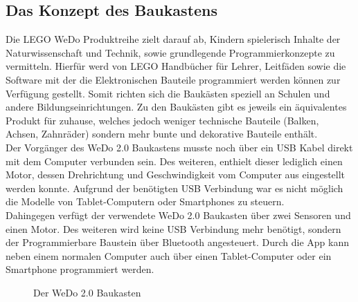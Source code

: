 \subsection{Das Konzept des Baukastens}
Die LEGO WeDo Produktreihe zielt darauf ab, Kindern spielerisch Inhalte der Naturwissenschaft und Technik, sowie grundlegende Programmierkonzepte zu vermitteln. Hierfür werd von LEGO Handbücher für Lehrer, Leitfäden sowie die Software mit der die Elektronischen Bauteile programmiert werden können zur Verfügung gestellt. Somit richten sich die Baukästen speziell an Schulen und andere Bildungseinrichtungen. Zu den Baukästen gibt es jeweils ein äquivalentes Produkt für zuhause, welches jedoch weniger technische Bauteile (Balken, Achsen, Zahnräder) sondern mehr bunte und dekorative Bauteile enthält.\\ 
Der Vorgänger des WeDo 2.0 Baukastens musste noch über ein USB Kabel direkt mit dem Computer verbunden sein. Des weiteren, enthielt dieser lediglich einen Motor, dessen Drehrichtung und Geschwindigkeit vom Computer aus eingestellt werden konnte. Aufgrund der benötigten USB Verbindung war es nicht möglich die Modelle von Tablet-Computern oder Smartphones zu steuern.  \\
Dahingegen verfügt der verwendete WeDo 2.0 Baukasten über zwei Sensoren und einen Motor. Des weiteren wird keine USB Verbindung mehr benötigt, sondern der Programmierbare Baustein über Bluetooth angesteuert. Durch die App kann neben einem normalen Computer auch über einen Tablet-Computer oder ein Smartphone programmiert werden.

\begin{figure}[htbp!]
	\centering
	\caption[Der WeDo 2.0 Baukasten]{Der WeDo 2.0 Baukasten} %
	\label{img:lego-education-wedo-20}
\end{figure} 

